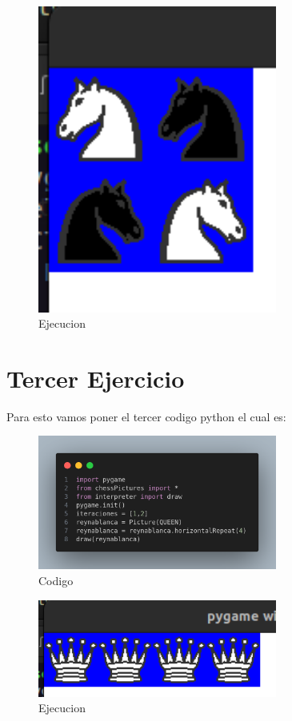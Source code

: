 \documentclass[10pt, a4paper]{article}
\begin{document}
\begin{figure}[H]
  \centering
  \includegraphics[width=0.7\textwidth]{img/Ejercicio2.png}
  \caption{Ejecucion}
\end{figure}

\section{Tercer Ejercicio}
Para esto vamos poner el tercer codigo python el cual es:  
\begin{figure}[H]
  \centering
  \includegraphics[width=0.7\textwidth]{img/Ej3.png}
  \caption{Codigo}
\end{figure}

\begin{figure}[H]
  \centering
  \includegraphics[width=0.7\textwidth]{img/Ejercicio3.png}
  \caption{Ejecucion}
\end{figure}
\end{document}
